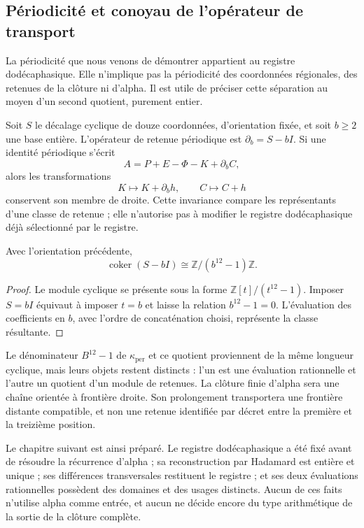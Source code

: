 

\subsection{Périodicité et conoyau de l'opérateur de transport}
\label{x_reciprocidad:subsec:k-clase-acarreo}

La périodicité que nous venons de démontrer appartient au registre dodécaphasique. Elle n'implique
pas la périodicité des coordonnées régionales, des retenues de la clôture
ni d'alpha. Il est utile de préciser cette séparation au moyen d'un second
quotient, purement entier.

Soit \(S\) le décalage cyclique de douze coordonnées, d'orientation fixée, et soit \(b\geq2\) une base entière. L'opérateur de retenue périodique est \(\partial_b=S-bI\). Si une identité périodique s'écrit
\[
 A=P+E-\Phi-K+\partial_bC,
\]
alors les transformations
\[
 K\longmapsto K+\partial_bh,\qquad C\longmapsto C+h
\]
conservent son membre de droite. Cette invariance compare les représentants d'une
classe de retenue ; elle n'autorise pas à modifier le registre dodécaphasique déjà
sélectionné par le registre.

\begin{proposition}
\label{x_reciprocidad:prop:k-cociente-acarreo}
Avec l'orientation précédente,
\[
 \operatorname{coker}(S-bI)\cong\mathbb Z/(b^{12}-1)\mathbb Z.
\]
\end{proposition}

\begin{proof}
Le module cyclique se présente sous la forme
\(\mathbb Z[t]/(t^{12}-1)\). Imposer \(S=bI\) équivaut à imposer
\(t=b\) et laisse la relation \(b^{12}-1=0\). L'évaluation des
coefficients en \(b\), avec l'ordre de concaténation choisi, représente
la classe résultante.
\end{proof}

Le dénominateur \(B^{12}-1\) de \(\kappa_{\mathrm{per}}\) et ce quotient proviennent de la même longueur cyclique, mais leurs objets restent distincts : l'un est une évaluation rationnelle et l'autre un quotient d'un module de retenues. La clôture finie d'alpha sera une chaîne orientée à frontière droite. Son prolongement transportera une frontière distante compatible, et non une retenue identifiée par décret entre la première et la treizième position.

Le chapitre suivant est ainsi préparé. Le registre dodécaphasique a été fixé avant
de résoudre la récurrence d'alpha ; sa reconstruction par Hadamard est
entière et unique ; ses différences transversales restituent le registre ; et
ses deux évaluations rationnelles possèdent des domaines et des usages distincts. Aucun
de ces faits n'utilise alpha comme entrée, et aucun ne décide encore du
type arithmétique de la sortie de la clôture complète.
